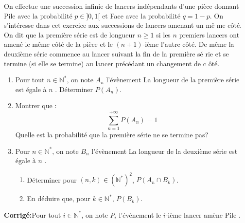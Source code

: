 \documentclass[a4paper,twoside,french,10pt]{VcCours}
\newcommand{\corr}{\textbf{Corrigé:}}
\begin{document}
\begin{Exercice}{} On effectue une succession infinie de lancers indépendants d'une pièce
donnant Pile avec la probabilité $p\in ]0,1[$ et Face avec la probabilité $%
q=1-p$.\newline
On s'intéresse dans cet exercice aux successions de lancers amenant un mê%
me côté.\newline
On dit que la première série est de longueur $n\geq 1$ si les $n$
premiers lancers ont amené le même côté de la pièce et le $(n+1)$-ième
l'autre côté.\newline
De même la deuxième série commence au lancer suivant la fin de la première sé%
rie et se termine (si elle se termine) au lancer précédant un changement de c%
ôté.\newline


\begin{enumerate}
\item Pour tout $n \in \mathbb{N}^*$, on note $A_n$ l'évènement \og La longueur de la première série est égale à $n$ \fg. Déterminer $P(A_n)$.
\item Montrer que :
\[\sum\limits_{n=1}^{+\infty }P(A_n)=1\]
Quelle est la probabilité que la première série ne se termine pas?

\item Pour $n \in \mathbb{N}^*$, on note $B_n$ l'évènement \og La longueur de la deuxième série est égale à $n$ \fg .

\begin{enumerate}
\item Déterminer pour $(n,k) \in (\mathbb{N}^*)^2$, $P(A_n \cap B_k)$.

\item En déduire que, pour $k\in \mathbb{N}^{* }$, $P(B_k)$.
\end{enumerate}
\end{enumerate}
\end{Exercice}

\corr Pour tout $i\in \mathbb{N}^{* }$, on note $P_{i}$ l'événement \og le $i$-ième lancer amène Pile \fg.
\end{document}
